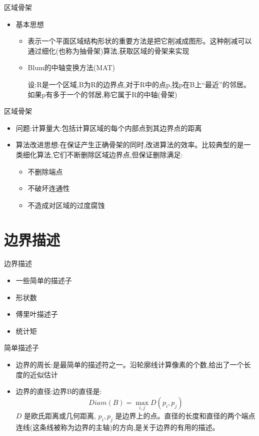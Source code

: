 \documentclass[presentation]{beamer}
\begin{document}
\begin{frame}[label={sec:org058bff5}]{区域骨架}
\begin{itemize}
\item 基本思想
\begin{itemize}
\item 表示一个平面区域结构形状的重要方法是把它削减成图形。这种削减可以通过细化(也称为抽骨架)算法,获取区域的骨架来实现
\item Blum的中轴变换方法(MAT)

设:R是一个区域,B为R的边界点,对于R中的点p,找p在B上“最近”的邻居。如果p有多于一个的邻居,称它属于R的中轴(骨架)
\end{itemize}
\end{itemize}
\end{frame}
\begin{frame}[label={sec:orga916f3b}]{区域骨架}
\begin{itemize}
\item 问题:计算量大:包括计算区域的每个内部点到其边界点的距离
\item 算法改进思想:在保证产生正确骨架的同时,改进算法的效率。比较典型的是一类细化算法,它们不断删除区域边界点,但保证删除满足:
\begin{itemize}
\item 不删除端点
\item 不破坏连通性
\item 不造成对区域的过度腐蚀
\end{itemize}
\end{itemize}
\end{frame}

\section{边界描述}
\label{sec:orga555afc}
\begin{frame}[label={sec:org1957e5e}]{边界描述}
\begin{itemize}
\item 一些简单的描述子

\item 形状数
\item 傅里叶描述子
\item 统计矩
\end{itemize}
\end{frame}

\begin{frame}[label={sec:org7d66961}]{简单描述子}
\begin{itemize}
\item 边界的周长:是最简单的描述符之一。沿轮廓线计算像素的个数,给出了一个长度的近似估计
\item 边界的直径:边界B的直径是:
\[ Diam(B)=\max_{i,j}  D(p_i,p_j) \]
 \(D\) 是欧氏距离或几何距离, \(p_i,p_j\) 是边界上的点。直径的长度和直径的两个端点连线(这条线被称为边界的主轴)的方向,是关于边界的有用的描述。
\end{itemize}
\end{frame}
\end{document}
